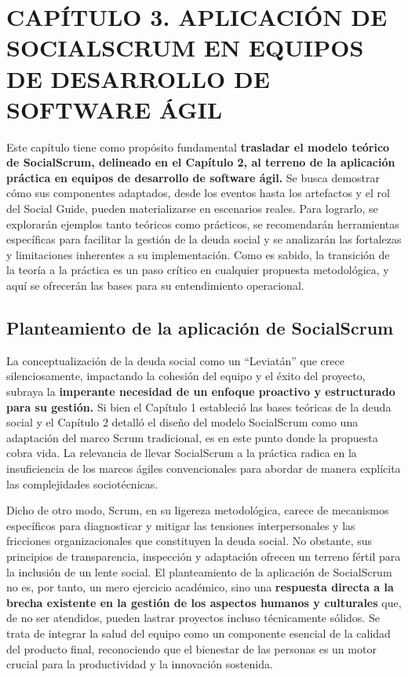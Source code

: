 \chapter*{CAPÍTULO 3. APLICACIÓN DE SOCIALSCRUM EN EQUIPOS DE DESARROLLO DE SOFTWARE ÁGIL}
\setcounter{chapter}{3}
\setcounter{section}{0}
\setcounter{subsection}{0}
\setcounter{subsubsection}{0}
\renewcommand{\thesection}{\thechapter.\arabic{section}}
\renewcommand{\thesubsection}{\thesection.\arabic{subsection}}
\renewcommand{\thesubsubsection}{\thesubsection.\arabic{subsubsection}}

Este capítulo tiene como propósito fundamental \textbf{trasladar el modelo teórico de SocialScrum, delineado en el Capítulo 2, al terreno de la aplicación práctica en equipos de desarrollo de software ágil.} Se busca demostrar cómo sus componentes adaptados, desde los eventos hasta los artefactos y el rol del Social Guide, pueden materializarse en escenarios reales. Para lograrlo, se explorarán ejemplos tanto teóricos como prácticos, se recomendarán herramientas específicas para facilitar la gestión de la deuda social y se analizarán las fortalezas y limitaciones inherentes a su implementación. Como es sabido, la transición de la teoría a la práctica es un paso crítico en cualquier propuesta metodológica, y aquí se ofrecerán las bases para su entendimiento operacional.

\section{Planteamiento de la aplicación de SocialScrum}
La conceptualización de la deuda social como un ``Leviatán'' que crece silenciosamente, impactando la cohesión del equipo y el éxito del proyecto, subraya la \textbf{imperante necesidad de un enfoque proactivo y estructurado para su gestión.} Si bien el Capítulo 1 estableció las bases teóricas de la deuda social y el Capítulo 2 detalló el diseño del modelo SocialScrum como una adaptación del marco Scrum tradicional, es en este punto donde la propuesta cobra vida. La relevancia de llevar SocialScrum a la práctica radica en la insuficiencia de los marcos ágiles convencionales para abordar de manera explícita las complejidades sociotécnicas.

Dicho de otro modo, Scrum, en su ligereza metodológica, carece de mecanismos específicos para diagnosticar y mitigar las tensiones interpersonales y las fricciones organizacionales que constituyen la deuda social. No obstante, sus principios de transparencia, inspección y adaptación ofrecen un terreno fértil para la inclusión de un lente social. El planteamiento de la aplicación de SocialScrum no es, por tanto, un mero ejercicio académico, sino una \textbf{respuesta directa a la brecha existente en la gestión de los aspectos humanos y culturales} que, de no ser atendidos, pueden lastrar proyectos incluso técnicamente sólidos. Se trata de integrar la salud del equipo como un componente esencial de la calidad del producto final, reconociendo que el bienestar de las personas es un motor crucial para la productividad y la innovación sostenida.

